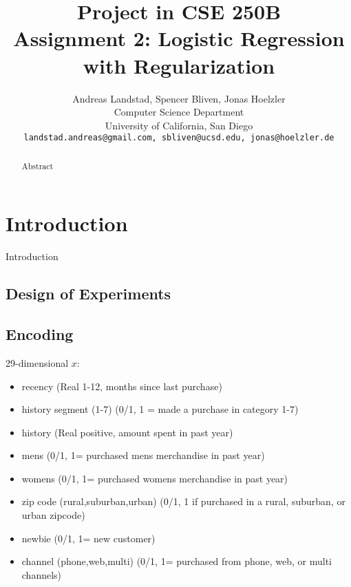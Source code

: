 \documentclass[10pt,twocolumn,letterpaper]{article}
\begin{document}
\title{
Project in CSE 250B\\
Assignment 2: Logistic Regression with Regularization}

\author{Andreas Landstad, Spencer Bliven, Jonas Hoelzler\\
Computer Science Department\\
University of California, San Diego\\
{\tt\small landstad.andreas@gmail.com, sbliven@ucsd.edu, jonas@hoelzler.de}
}%
\maketitle
\thispagestyle{empty}

\begin{abstract}
Abstract
\end{abstract}

\section{Introduction}
Introduction
\subsection{Design of Experiments}

\subsection{Encoding}

29-dimensional $x$:
\begin{itemize}
\item recency (Real 1-12, months since last purchase)
\item history segment (1-7) (0/1, 1 = made a purchase in category 1-7)
\item history (Real positive, amount spent in past year)
\item mens (0/1, 1= purchased mens merchandise in past year)
\item womens (0/1, 1= purchased womens merchandise in past year)
\item zip code (rural,suburban,urban) (0/1, 1 if purchased in a rural, suburban, or urban zipcode)
\item newbie (0/1, 1= new customer)
\item channel (phone,web,multi) (0/1, 1= purchased from phone, web, or multi channels)
\end{itemize}
\end{document}
